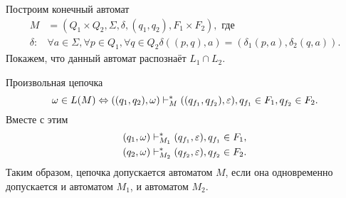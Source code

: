 Построим конечный автомат
\begin{align*}
M &= (Q_1 \times Q_2,\Sigma, \delta, (q_1, q_2), F_1 \times F_2),\text{ где}\\
\delta:& \forall a \in \Sigma, \forall p \in Q_1, \forall q \in Q_2 \delta((p, q), a) = (\delta_1(p,a), \delta_2(q,a)).
\end{align*}
Покажем, что данный автомат распознаёт $L_1 \cap L_2$.

Произвольная цепочка
\[\omega \in L(M) 
    \Leftrightarrow 
    ((q_1, q_2), \omega) \vdash_{M}^* ((q_{f_1}, q_{f_2}), \varepsilon), q_{f_1} \in F_1, q_{f_2} \in F_2.\] 
Вместе с этим 
\begin{align*}
  (q_1, \omega) &\vdash_{M_1}^* (q_{f_1}, \varepsilon),  q_{f_1} \in F_1, \\
  (q_2, \omega) &\vdash_{M_2}^* (q_{f_2}, \varepsilon), q_{f_2} \in F_2.
\end{align*}
Таким образом, цепочка допускается автоматом $M$, если она одновременно допускается и автоматом $M_1$, и автоматом $M_2$.

